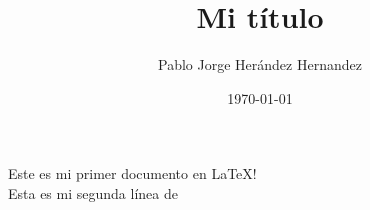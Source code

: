 \documentclass{article} %
\title{Mi t\'itulo}
\date{\today}
\author{Pablo Jorge Her\'andez Hernandez}
\begin{document}
\tableofcontents



%



Este es mi primer documento en \LaTeX!\\

Esta es mi segunda l\'inea de 
\end{document}
